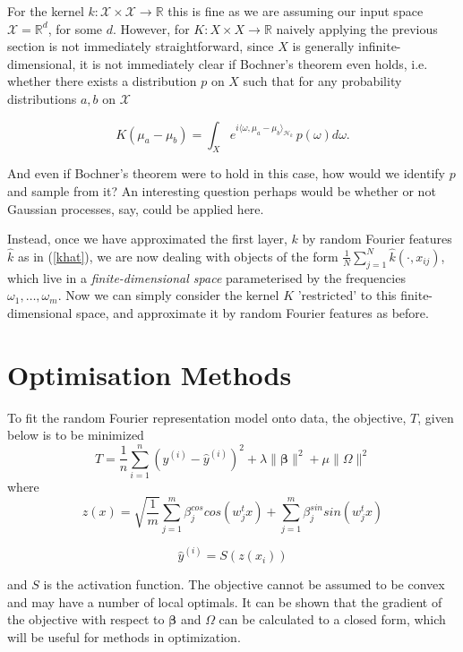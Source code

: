 \documentclass{article} %
\newcommand{\vectGreek}[1]{\boldsymbol{#1}}
\newcommand{\matr}[1]{\mathsf{#1}}
\begin{document}
For the kernel $k: \mathcal{X}\times\mathcal{X}\rightarrow\mathbb{R}$ this is fine as we are assuming our input space $\mathcal{X}=\mathbb{R}^d$, for some $d$. However, for $K: X \times X\rightarrow\mathbb{R}$ naively applying the previous section is not immediately straightforward, since $X$ is generally infinite-dimensional, it is not immediately clear if Bochner's theorem even holds, i.e. whether there exists a distribution $p$ on $X$ such that for any probability distributions $a,b$ on $\mathcal{X}$

$$K(\mu_a - \mu_b)=\int_X e^{i \langle\omega ,\mu_a - \mu_b \rangle_{\mathcal{H}_k}}\, p(\omega) d\omega.$$

And even if Bochner's theorem were to hold in this case, how would we identify $p$ and sample from it? An interesting question perhaps would be whether or not Gaussian processes, say, could be applied here.

Instead, once we have approximated the first layer, $k$ by random Fourier features $\hat{k}$ as in (\ref{khat}), we are now dealing with objects of the form $\frac{1}{N} \sum_{j=1}^N \hat{k}(\cdot,x_{ij})$, which live in a \textit{finite-dimensional space} parameterised by the frequencies $\omega_1,\dots,\omega_m$. Now we can simply consider the kernel $K$ 'restricted' to this finite-dimensional space, and approximate it by random Fourier features as before.

\section{Optimisation Methods }

To fit the random Fourier representation model onto data, the objective, $T$, given below is to be minimized
\begin{equation}\label{loss}
T=\frac{1}{n}\sum_{i=1}^{n}
\left(
	y^{(i)}-\hat{y}^{(i)}
\right)^2
+\lambda\|\vectGreek{\beta}\|^2
+\mu\|\matr{\Omega}\|^2
\end{equation}
where
\begin{equation} \label{transf_x}
z(x) = \sqrt{ \frac{1}{m}} \sum_{j=1}^{m} \beta_{j}^{cos} cos( w_{j}^{t} x ) + \sum_{j=1}^{m} \beta_{j}^{sin} sin( w_{j}^{t} x )
\end{equation}

\begin{equation}\label{pred_y}
\hat{y}^{(i)}=S( z (x_{i} ))
\end{equation}

and $S$ is the activation function. The objective cannot be assumed to be convex and may have a number of local optimals. It can be shown that the gradient of the objective with respect to $\vectGreek{\beta}$ and $\matr{\Omega}$ can be calculated to a closed form, which will be useful for methods in optimization.
\end{document}
